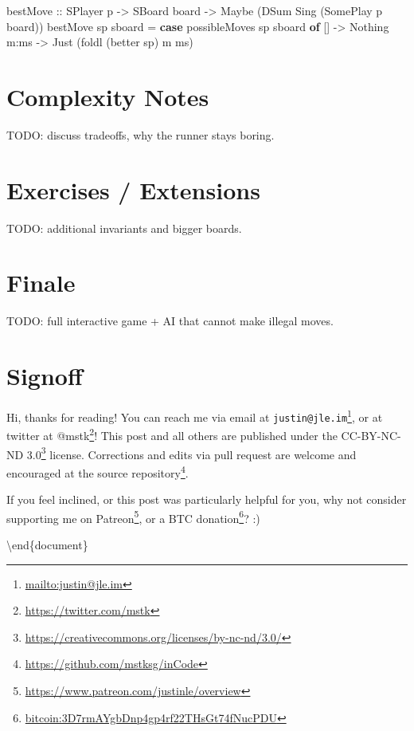 \documentclass[]{article}
\newenvironment{Shaded}{}{}
\newcommand{\DataTypeTok}[1]{\textcolor[rgb]{0.56,0.13,0.00}{#1}}
\newcommand{\KeywordTok}[1]{\textcolor[rgb]{0.00,0.44,0.13}{\textbf{#1}}}
\newcommand{\NormalTok}[1]{#1}
\newcommand{\OperatorTok}[1]{\textcolor[rgb]{0.40,0.40,0.40}{#1}}
\newcommand{\OtherTok}[1]{\textcolor[rgb]{0.00,0.44,0.13}{#1}}
\renewcommand{\href}[2]{#2\footnote{\url{#1}}}
\begin{document}
\begin{Shaded}
\begin{Highlighting}[]
\NormalTok{bestMove}
\OtherTok{    ::} \DataTypeTok{SPlayer}\NormalTok{ p}
    \OtherTok{{-}\textgreater{}} \DataTypeTok{SBoard}\NormalTok{ board}
    \OtherTok{{-}\textgreater{}} \DataTypeTok{Maybe}\NormalTok{ (}\DataTypeTok{DSum} \DataTypeTok{Sing}\NormalTok{ (}\DataTypeTok{SomePlay}\NormalTok{ p board))}
\NormalTok{bestMove sp sboard }\OtherTok{=} \KeywordTok{case}\NormalTok{ possibleMoves sp sboard }\KeywordTok{of}
\NormalTok{    [] }\OtherTok{{-}\textgreater{}} \DataTypeTok{Nothing}
\NormalTok{    m}\OperatorTok{:}\NormalTok{ms }\OtherTok{{-}\textgreater{}} \DataTypeTok{Just}\NormalTok{ (foldl\textquotesingle{} (better sp) m ms)}
\end{Highlighting}
\end{Shaded}

\section{Complexity Notes}\label{complexity-notes}

TODO: discuss tradeoffs, why the runner stays boring.

\section{Exercises / Extensions}\label{exercises-extensions}

TODO: additional invariants and bigger boards.

\section{Finale}\label{finale}

TODO: full interactive game + AI that cannot make illegal moves.

\section{Signoff}\label{signoff}

Hi, thanks for reading! You can reach me via email at
\href{mailto:justin@jle.im}{\nolinkurl{justin@jle.im}}, or at twitter at
\href{https://twitter.com/mstk}{@mstk}! This post and all others are published
under the \href{https://creativecommons.org/licenses/by-nc-nd/3.0/}{CC-BY-NC-ND
3.0} license. Corrections and edits via pull request are welcome and encouraged
at \href{https://github.com/mstksg/inCode}{the source repository}.

If you feel inclined, or this post was particularly helpful for you, why not
consider \href{https://www.patreon.com/justinle/overview}{supporting me on
Patreon}, or a \href{bitcoin:3D7rmAYgbDnp4gp4rf22THsGt74fNucPDU}{BTC donation}?
:)

\textbackslash end\{document\}
\end{document}
